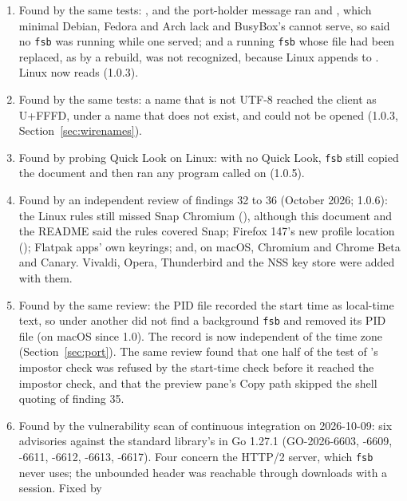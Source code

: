 \begin{enumerate}
        , which they did not reach (1.0.4).
  \item Found by the same tests: ,  and the port-holder message ran
         and , which minimal Debian, Fedora and Arch lack and BusyBox's
         cannot serve, so  said no \texttt{fsb} was running while one
        served; and a running \texttt{fsb} whose file had been replaced, as by a rebuild, was not
        recognized, because Linux appends  to .  Linux now
        reads  (1.0.3).
  \item Found by the same tests: a name that is not UTF-8 reached the client as U+FFFD, under a
        name that does not exist, and could not be opened (1.0.3,
        Section~\ref{sec:wirenames}).
  \item Found by probing Quick Look on Linux: with no Quick Look, \texttt{fsb} still copied the
        document and then ran any program called  on  (1.0.5).
  \item Found by an independent review of findings 32 to 36 (October 2026; 1.0.6): the
        Linux rules still missed Snap Chromium (),
        although this document and the README said the rules covered Snap; Firefox 147's new
        profile location (); Flatpak apps' own keyrings; and, on
        macOS, Chromium and Chrome Beta and Canary.  Vivaldi, Opera, Thunderbird and the NSS
        key store were added with them.
  \item Found by the same review: the PID file recorded the start time as local-time text, so
         under another  did not find a background \texttt{fsb} and
        removed its PID file (on macOS since 1.0).  The record is now independent of the time
        zone (Section~\ref{sec:port}).  The same review found that one half of the test of
        's impostor check was refused by the start-time check before it reached
        the impostor check, and that the preview pane's Copy path skipped the shell quoting
        of finding 35.
  \item Found by the vulnerability scan of continuous integration on 2026-10-09: six advisories against the
        standard library's  in Go 1.27.1 (GO-2026-6603, -6609, -6611, -6612,
        -6613, -6617).  Four concern the HTTP/2 server, which \texttt{fsb} never uses; the
        unbounded  header was reachable through downloads with a session.  Fixed by

\end{enumerate}
